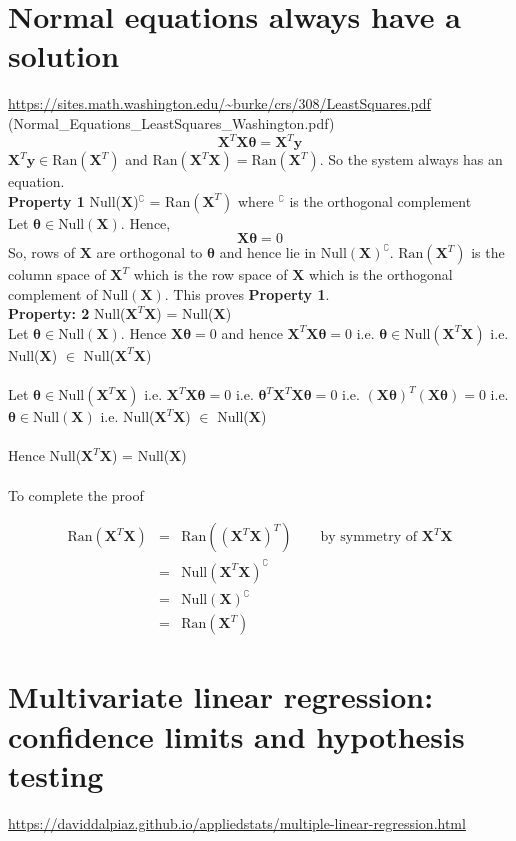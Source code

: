 \documentclass{article}
\newcommand{\beq}{\begin{equation}}
\newcommand{\eeq}{\end{equation}}
\newcommand{\ber}{\begin{eqnarray}}
\newcommand{\eer}{\end{eqnarray}}
\begin{document}
\section{Normal equations always have a solution}
\url{https://sites.math.washington.edu/~burke/crs/308/LeastSquares.pdf} (Normal\_Equations\_LeastSquares\_Washington.pdf)
\beq
\pmb{X}^T\pmb{X}\pmb{\theta} = \pmb{X}^T\pmb{y}
\eeq
$\pmb{X}^T\pmb{y} \in \text{Ran}({\pmb{X}^T})$  and $\text{Ran}(\pmb{X}^T\pmb{X})=\text{Ran}(\pmb{X}^T)$. So the system always has an equation. \\

\textbf{Property 1} Null($\pmb{X}$)$^\complement$ = Ran$(\pmb{X}^T)$ where $^\complement$ is the orthogonal complement\\

Let $\pmb{\theta}\in\text{Null}(\pmb{X})$. Hence,
\beq
\pmb{X}\pmb{\theta} = 0
\eeq
So, rows of $\pmb{X}$ are orthogonal to $\pmb{\theta}$ and hence lie in $\text{Null}(\pmb{X})^\complement$. $\text{Ran}(\pmb{X}^T)$ is the column space of $\pmb{X}^T$ which is the row space of $\pmb{X}$ which is the orthogonal complement of $\text{Null}(\pmb{X})$. This proves \textbf{Property 1}.\\

\textbf{Property: 2 } Null($\pmb{X}^T\pmb{X}$) = Null($\pmb{X}$)\\

Let $\pmb{\theta}\in\text{Null}(\pmb{X})$. Hence $\pmb{X}\pmb{\theta}=0$ and hence $\pmb{X}^T\pmb{X}\pmb{\theta}=0$ i.e. $\pmb{\theta}\in\text{Null}(\pmb{X}^T\pmb{X})$ i.e. Null($\pmb{X}$) $\in$  Null($\pmb{X}^T\pmb{X}$) \\\\
%
Let $\pmb{\theta}\in\text{Null}(\pmb{X}^T\pmb{X})$ i.e. $\pmb{X}^T\pmb{X}\pmb{\theta}=0$ i.e. $\pmb{\theta}^T\pmb{X}^T\pmb{X}\pmb{\theta}=0$ i.e. $(\pmb{X}\pmb{\theta})^T(\pmb{X}\pmb{\theta})=0$ i.e. $\pmb{\theta}\in\text{Null}(\pmb{X})$ i.e. Null($\pmb{X}^T\pmb{X}$) $\in$ Null($\pmb{X}$)\\\\
%
%
Hence Null($\pmb{X}^T\pmb{X}$) = Null($\pmb{X}$)\\\\
%
%
%
To complete the proof

\ber
\text{Ran}(\pmb{X}^T\pmb{X}) &=& \text{Ran}((\pmb{X}^T\pmb{X})^T) \qquad \text{by symmetry of } \pmb{X}^T\pmb{X}\\
&=& \text{Null}(\pmb{X}^T\pmb{X})^\complement \\
&=& \text{Null}(\pmb{X})^\complement\\
&=& \text{Ran}(\pmb{X}^T)
\eer


%
%
%
\section{Multivariate linear regression: confidence limits and hypothesis testing}
\url{https://daviddalpiaz.github.io/appliedstats/multiple-linear-regression.html}
%
%
%
\end{document}
